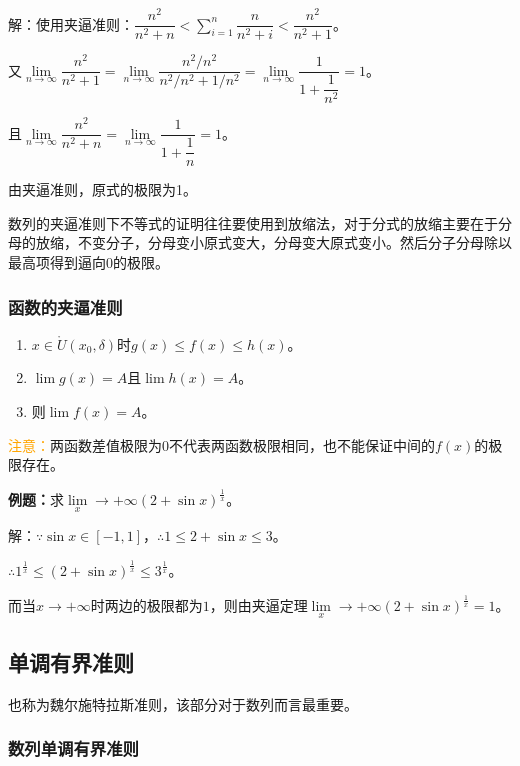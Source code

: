 \documentclass[UTF8, 12pt]{ctexart}
\begin{document}
        解：使用夹逼准则：$\dfrac{n^2}{n^2+n}<\sum_{i=1}^n\dfrac{n}{n^2+i}<\dfrac{n^2}{n^2+1}$。

        又$\lim\limits_{n\to\infty}\dfrac{n^2}{n^2+1}=\lim\limits_{n\to\infty}\dfrac{n^2/n^2}{n^2/n^2+1/n^2}=\lim\limits_{n\to\infty}\dfrac{1}{1+\dfrac{1}{n^2}}=1$。

        且$\lim\limits_{n\to\infty}\dfrac{n^2}{n^2+n}=\lim\limits_{n\to\infty}\dfrac{1}{1+\dfrac{1}{n}}=1$。

        由夹逼准则，原式的极限为1。

        数列的夹逼准则下不等式的证明往往要使用到放缩法，对于分式的放缩主要在于分母的放缩，不变分子，分母变小原式变大，分母变大原式变小。然后分子分母除以最高项得到逼向0的极限。

        \subsubsection{函数的夹逼准则}

        \begin{enumerate}
            \item $x\in\mathring{U}(x_0,\delta)$时$g(x)\leqslant f(x)\leqslant h(x)$。
            \item $\lim g(x)=A$且$\lim h(x)=A$。
            \item 则$\lim f(x)=A$。
        \end{enumerate}

        \textcolor{orange}{注意：}两函数差值极限为0不代表两函数极限相同，也不能保证中间的$f(x)$的极限存在。

        \textbf{例题：}求$\lim\limits_x\to+\infty(2+\sin x)^{\frac{1}{x}}$。

        解：$\because \sin x\in[-1,1]$，$\therefore 1\leqslant 2+\sin x\leqslant 3$。

        $\therefore 1^{\frac{1}{x}}\leqslant\left(2+\sin x\right)^{\frac{1}{x}}\leqslant 3^{\frac{1}{x}}$。

        而当$x\to+\infty$时两边的极限都为$1$，则由夹逼定理$\lim\limits_x\to+\infty(2+\sin x)^{\frac{1}{x}}=1$。

        \subsection{单调有界准则}

        也称为魏尔施特拉斯准则，该部分对于数列而言最重要。

        \subsubsection{数列单调有界准则}
\end{document}
